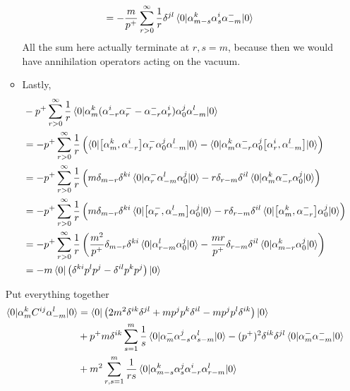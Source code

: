 \begin{enumerate}[label=(\alph*)]
\begin{itemize}
\begin{align*}
																							  &= - \frac{m}{p^+} \sum_{r>0}^{\infty} \frac{1}{r} \delta^{jl} \braket{0| \alpha^k_{m-s} \alpha_s^i \alpha^-_{-m} | 0}
				\end{align*}
				All the sum here actually terminate at $r,s = m$, because then we would have annihilation operators acting on the vacuum.
			\item Lastly,
				\begin{align*}
					& -p^+ \sum_{r>0}^{\infty} \frac{1}{r} \braket{0| \alpha^k_m (\alpha^i_{-r} \alpha^-_r - \alpha^-_{-r} \alpha^i_r) \alpha^j_0 \alpha^l_{-m} |0} \\
					&= -p^+ \sum_{r>0}^{\infty} \frac{1}{r} \left( \braket{0| \comm{\alpha^k_m}{\alpha^i_{-r}} \alpha^-_r \alpha^j_0 \alpha^l_{-m} |0} - \braket{0| \alpha^k_m \alpha^-_{-r} \alpha^j_0 \comm{\alpha^i_r}{\alpha^l_{-m}}   |0} \right) \\
					&= -p^+ \sum_{r>0}^{\infty} \frac{1}{r} \left( m \delta_{m-r} \delta^{ki}\braket{0 |  \alpha^-_r   \alpha^l_{-m} \alpha^j_0| 0} - r \delta_{r-m} \delta^{il} \braket{0 | \alpha^k_{m}\alpha^-_{-r} \alpha_0^j  | 0} \right) \\
					&= -p^+ \sum_{r>0}^{\infty} \frac{1}{r} \left( m \delta_{m-r} \delta^{ki}\braket{0 |  \comm{\alpha^-_r}{\alpha^l_{-m}} \alpha^j_0| 0} - r \delta_{r-m} \delta^{il} \braket{0 | \comm{\alpha^k_{m}}{\alpha^-_{-r}} \alpha_0^j  | 0} \right) \\
					&= -p^+ \sum_{r>0}^{\infty} \frac{1}{r} \left( \frac{m^2}{p^+} \delta_{m-r} \delta^{ki}\braket{0 | \alpha^l_{r-m}  \alpha^j_0| 0} - \frac{mr}{p^+} \delta_{r-m} \delta^{il} \braket{0 | \alpha^k_{m-r} \alpha_0^j  | 0} \right) \\
					&= -m \braket{0|  \left( \delta^{ki} p^l p^j - \delta^{il} p^k p^j \right) |0}
				\end{align*}
		\end{itemize}
		Put everything together
		\begin{align}
			\begin{split}
			\braket{0 | \alpha^k_m C^{ij} \alpha^l_{-m} | 0} &= \braket{0 | \left( 2m^2\delta^{ik}\delta^{jl} + mp^j p^k \delta^{il} - mp^j p^l \delta^{ik} \right) | 0} \\
																			 &+p^+m\delta^{ik} \sum_{s=1}^{m} \frac{1}{s} \braket{0 | \alpha^-_m \alpha^j_{-s}\alpha^l_{s-m} | 0} - (p^+)^2 \delta^{ik}\delta^{jl} \braket{0 | \alpha^-_m \alpha^-_{-m} | 0} \\
																			 &+ m^2 \sum_{r,s=1}^{m} \frac{1}{rs} \braket{0 | \alpha^k_{m-s} \alpha^j_s \alpha^i_{-r} \alpha^l_{r-m} | 0} \\

\end{split}
\end{align}
\end{enumerate}
